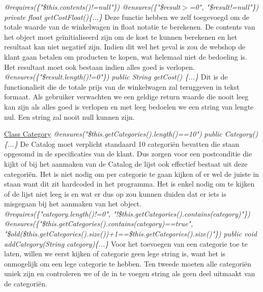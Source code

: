 \documentclass{article}
\begin{document}
\noindent
\textit{@requires(\{"\$this.contents()!=null"\})}\newline
\textit{@ensures(\{"\$result$>$=0", "\$result!=null"\})}\newline
\textit{private float getCostFloat()\{...\}}\newline
Deze functie hebben we zelf toegevoegd om de totale waarde van de winkelwagen in float notatie te berekenen. De contents van het object moet ge\"{i}nitialiseerd zijn om de kost te kunnen berekenen en het resultaat kan niet negatief zijn. Indien dit wel het geval is zou de webshop de klant gaan betalen om producten te kopen, wat helemaal niet de bedoeling is. Het resultaat moet ook bestaan indien alles goed is verlopen.\\

\noindent
\textit{@ensures(\{"\$result.length()!=0"\})}\newline
\textit{public String getCost() \{...\}}\newline
Dit is de functionalieit die de totale prijs van de winkelwagen zal teruggeven in tekst formaat. Als gebruiker verwachten we een geldige return waarde die nooit leeg kan zijn als alles goed is verlopen en met leeg bedoelen we een string van lengte nul. Een string zal nooit null kunnen zijn.\\

\newpage

\noindent
\underline{Class Category}\newline
\textit{@ensures("\$this.getCategories().length()==10")}\newline
\textit{public Category()\{...\}}\newline
De Catalog moet verplicht standaard 10 categori\"{e}n bevatten die staan opgesomd in de specificaties van de klant. Dus zorgen voor een postconditie die kijkt of bij het aanmaken van de Catalog de lijst ook effectief bestaat uit deze categori\"{e}n. Het is niet nodig om per categorie te gaan kijken of er wel de juiste in staan want dit zit hardcoded in het programma. Het is enkel nodig om te kijken of de lijst niet leeg is en wat er dus op zou kunnen duiden dat er iets is misgegaan bij het aanmaken van het object.\\

\noindent
\textit{@requires(\{"category.length()!=0", "!\$this.getCategories().contains(category)"\})}\newline
\textit{@ensures(\{"\$this.getCategories().contains(category)==true", "\$old(\$this.getCategories().size())+1==\$this.getCategories().size()"\})}\newline
\textit{public void addCategory(String category)\{...\}}\newline
Voor het toevoegen van een categorie toe te laten, willen we eerst kijken of categorie geen lege string is, want het is onmogelijk om een lege categorie te hebben. Ten tweede moeten alle categori\"{e}n uniek zijn en controleren we of de in te voegen string als geen deel uitmaakt van de categori\"{e}n. \\
\end{document}
